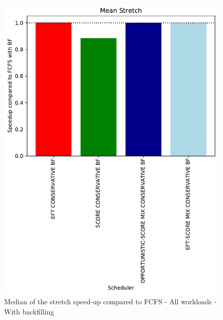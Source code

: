 \documentclass[conference,10pt]{IEEEtran}
\begin{document}
\begin{figure}\centering\includegraphics[width=1\linewidth]{../MBSS/plot/Results_Percentage_FCFS_BF_All_workloads_mediane_Mean_Stretch_450_128_32_256_4_1024.pdf}\caption{Median of the stretch speed-up compared to FCFS - All workloads - With backfilling}\end{figure}
\end{document}
